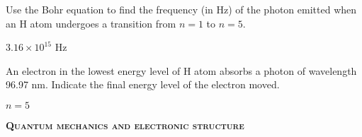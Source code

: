 \documentclass[main.tex]{subfiles}
\begin{document}
\begin{multicols*}{2}
\vspace{-0.5cm}\begin{question}[ID=\the\value{numA}]
Use the Bohr equation to  find the frequency (in Hz) of the photon emitted when an H atom undergoes a transition from $n=1$ to $n=5$.
 \end{question}
\begin{solution}
$3.16\times10^{15}$ Hz
\hspace{0.1cm}\end{solution}
\vspace{-0.5cm}\begin{question}[ID=\the\value{numA}]
An electron in the lowest energy level of H atom absorbs a photon of wavelength 96.97 nm. Indicate the final energy level of the electron moved.
 \end{question}
\begin{solution}
 $n=5$
\hspace{0.1cm}\end{solution}


{\raggedright\textsc{\textbf{Quantum mechanics and electronic structure }}\par}


\end{multicols*}
\end{document}
